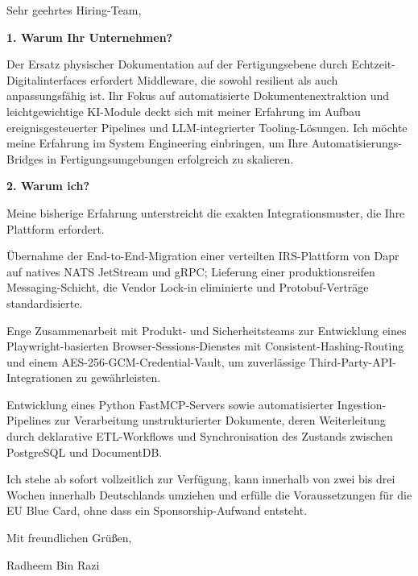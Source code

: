 \documentclass[11pt,a4paper]{coverletter}
\begin{document}
\opening{Sehr geehrtes Hiring-Team,}

\vspace{8pt}\noindent\textbf{1. Warum Ihr Unternehmen?}\par\vspace{3pt}

Der Ersatz physischer Dokumentation auf der Fertigungsebene durch Echtzeit-Digitalinterfaces erfordert Middleware, die sowohl resilient als auch anpassungsfähig ist. Ihr Fokus auf automatisierte Dokumentenextraktion und leichtgewichtige KI-Module deckt sich mit meiner Erfahrung im Aufbau ereignisgesteuerter Pipelines und LLM-integrierter Tooling-Lösungen. Ich möchte meine Erfahrung im System Engineering einbringen, um Ihre Automatisierungs-Bridges in Fertigungsumgebungen erfolgreich zu skalieren.

\vspace{8pt}\noindent\textbf{2. Warum ich?}\par\vspace{3pt}

Meine bisherige Erfahrung unterstreicht die exakten Integrationsmuster, die Ihre Plattform erfordert.

\bullets

  \item Übernahme der End-to-End-Migration einer verteilten IRS-Plattform von Dapr auf natives NATS JetStream und gRPC; Lieferung einer produktionsreifen Messaging-Schicht, die Vendor Lock-in eliminierte und Protobuf-Verträge standardisierte.

  \item Enge Zusammenarbeit mit Produkt- und Sicherheitsteams zur Entwicklung eines Playwright-basierten Browser-Sessions-Dienstes mit Consistent-Hashing-Routing und einem AES-256-GCM-Credential-Vault, um zuverlässige Third-Party-API-Integrationen zu gewährleisten.

  \item Entwicklung eines Python FastMCP-Servers sowie automatisierter Ingestion-Pipelines zur Verarbeitung unstrukturierter Dokumente, deren Weiterleitung durch deklarative ETL-Workflows und Synchronisation des Zustands zwischen PostgreSQL und DocumentDB.

\bulletsend

Ich stehe ab sofort vollzeitlich zur Verfügung, kann innerhalb von zwei bis drei Wochen innerhalb Deutschlands umziehen und erfülle die Voraussetzungen für die EU Blue Card, ohne dass ein Sponsorship-Aufwand entsteht.

\closing{Mit freundlichen Grüßen,}{Radheem Bin Razi}
\end{document}
